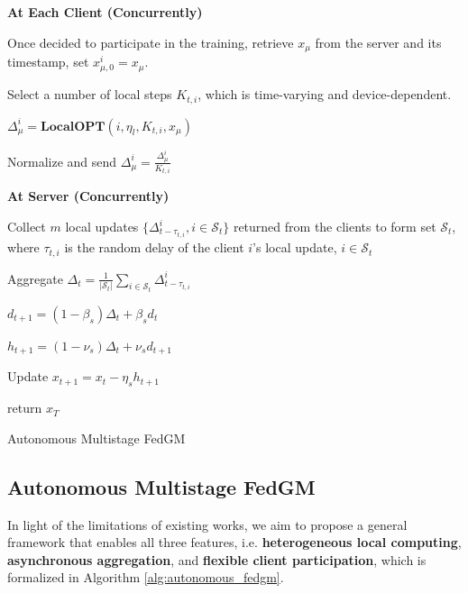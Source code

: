 \begin{algorithm2e}[tb]
\SetAlgoVlined
{}
\SetAlgoLined
{}
{
{   
    \colorbox{babyblueeyes}{\textbf{At Each Client (Concurrently)}}
    
    Once decided to participate in the training, retrieve $x_\mu$ from the server and its timestamp, set $x_{\mu,0}^i=x_\mu$.

    Select a number of local steps $K_{t,i}$, which is time-varying and device-dependent.

    $\Delta_\mu^i=\textbf{LocalOPT}\left(i,\eta_l,K_{t,i},x_\mu\right)$

    Normalize and send $\Delta_\mu^i=\frac{\Delta_\mu^i}{K_{t,i}}$
    

    \colorbox{babyblueeyes}{\textbf{At Server (Concurrently)}}
    
    Collect $m$ local updates $\{\Delta_{t-\tau_{t,i}}^i, i\in\mathcal{S}_t\}$ returned from the clients to form set $\mathcal{S}_t$, where $\tau_{t,i}$ is the random delay of the client $i$'s local update, $i\in\mathcal{S}_t$

    Aggregate $\Delta_t=\frac{1}{\lvert\mathcal{S}_t\rvert}\sum_{i\in \mathcal{S}_t}\Delta_{t-\tau_{t,i}}^i$

    $d_{t+1}=(1-\beta_s)\Delta_{t}+\beta_s d_{t}$

    $h_{t+1}=(1-\nu_s)\Delta_{t}+\nu_s d_{t+1}$
        
    Update $x_{t+1}=x_t-\eta_s h_{t+1}$

}
}
return $x_T$
\caption{\colorbox{babyblueeyes}{Autonomous Multistage FedGM}}
\label{alg:autonomous_fedgm}
\end{algorithm2e}

\subsection{Autonomous Multistage FedGM}

In light of the limitations of existing works, we aim to propose a general framework that enables all three features, i.e. \textbf{heterogeneous local computing}, \textbf{asynchronous aggregation}, and \textbf{flexible client participation}, which is formalized in Algorithm \ref{alg:autonomous_fedgm}.

